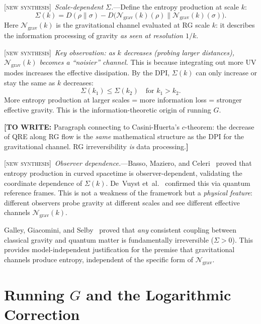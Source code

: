 \documentclass[prl,twocolumn,superscriptaddress,longbibliography,floatfix]{revtex4-2}
\newcommand{\chan}{\mathcal{N}}
\newcommand{\newsyn}{\textsc{[new synthesis]}}
\newcommand{\towrite}[1]{{\color{blue}\textbf{[TO WRITE:} #1\textbf{]}}}
\begin{document}
\newsyn\ \emph{Scale-dependent $\Sigma$.}---Define the entropy
production at scale $k$:
\begin{equation}
\Sigma(k) = D(\rho\|\sigma)
  - D\!\big(\chan_{\mathrm{grav}}(k)(\rho)
    \big\|\chan_{\mathrm{grav}}(k)(\sigma)\big).
\label{eq:sigma_k}
\end{equation}
Here $\chan_{\mathrm{grav}}(k)$ is the gravitational channel
evaluated at RG scale $k$: it describes the information processing
of gravity \emph{as seen at resolution $1/k$}.

\newsyn\ \emph{Key observation: as $k$ decreases (probing larger
distances), $\chan_{\mathrm{grav}}(k)$ becomes a ``noisier'' channel.}
This is because integrating out more UV modes increases the effective
dissipation. By the DPI, $\Sigma(k)$ can only increase or stay
the same as $k$ decreases:
\begin{equation}
\Sigma(k_1) \leq \Sigma(k_2) \quad \text{for } k_1 > k_2.
\label{eq:sigma_monotone}
\end{equation}
More entropy production at larger scales = more information loss =
stronger effective gravity. This is the information-theoretic origin
of running $G$.

\towrite{Paragraph connecting to Casini-Huerta's $c$-theorem:
the decrease of QRE along RG flow is the \emph{same} mathematical
structure as the DPI for the gravitational channel. RG irreversibility
\emph{is} data processing.}

\newsyn\ \emph{Observer dependence.}---Basso, Maziero, and
Celeri~\cite{BassoCeleri2025} proved that entropy production
in curved spacetime is observer-dependent, validating the
coordinate dependence of $\Sigma(k)$. De~Vuyst
et~al.~\cite{DeVuyst2025} confirmed this via quantum reference
frames. This is not a weakness of the framework but a
\emph{physical feature}: different observers probe gravity
at different scales and see different effective channels
$\chan_{\mathrm{grav}}(k)$.

Galley, Giacomini, and Selby~\cite{GalleyGiacominiSelby2023}
proved that \emph{any} consistent coupling between classical
gravity and quantum matter is fundamentally irreversible
($\Sigma > 0$). This provides model-independent justification
for the premise that gravitational channels produce entropy,
independent of the specific form of $\chan_{\mathrm{grav}}$.

\section{Running $G$ and the Logarithmic Correction}
\label{sec:running_G}
\end{document}
